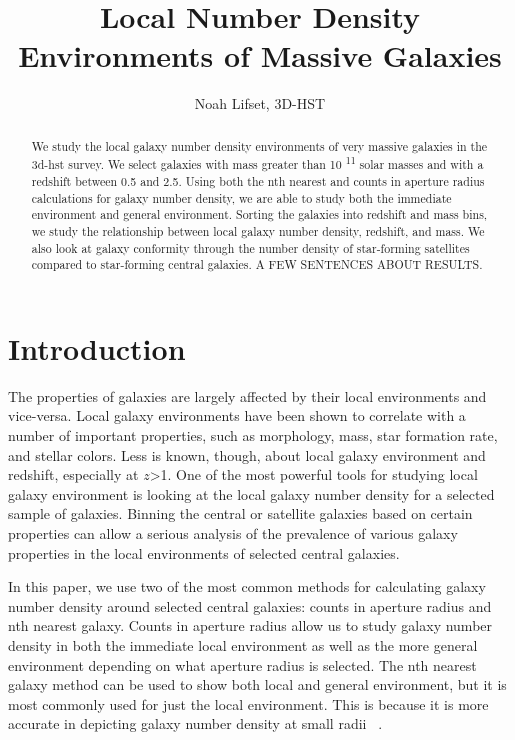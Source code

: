 \documentclass[apj]{emulateapj}
\begin{document}
 
\title{Local Number Density Environments of Massive Galaxies}

\author{Noah Lifset, 3D-HST}

\begin{abstract}

We study the local galaxy number density environments of very massive galaxies in the 3d-hst survey. We select galaxies with mass greater than 10 \textsuperscript{11} solar masses and with a redshift between 0.5 and 2.5. Using both the nth nearest and counts in aperture radius calculations for galaxy number density, we are able to study both the immediate environment and general environment. Sorting the galaxies into  redshift and mass bins, we study the relationship between local galaxy number density, redshift, and mass. We also look at galaxy conformity through the number density of star-forming satellites compared to star-forming central galaxies. A FEW SENTENCES ABOUT RESULTS.
\end{abstract}
\keywords{}

\section{Introduction}

The properties of galaxies are largely affected by their local environments and vice-versa. Local galaxy environments have been shown to correlate with a number of important properties, such as morphology, mass, star formation rate, and stellar colors. Less is known, though, about local galaxy environment and redshift, especially at  $z$\textgreater1. One of the most powerful tools for studying local galaxy environment is looking at the local galaxy number density for a selected sample of galaxies. Binning the central or satellite galaxies based on certain properties can allow a serious analysis of the prevalence of various galaxy properties in the local environments of selected central galaxies. 

In this paper, we use two of the most common methods for calculating galaxy number density around selected central galaxies: counts in aperture radius and nth nearest galaxy. Counts in aperture radius allow us to study galaxy number density in both the immediate local environment as well as the more general environment depending on what aperture radius is selected. The nth nearest galaxy method can be used to show both local and general environment, but it is most commonly used for just the local environment. This is because it is more accurate in depicting galaxy number density at small radii ~\cite{2005ApJ...634..833C}. 
\end{document}
